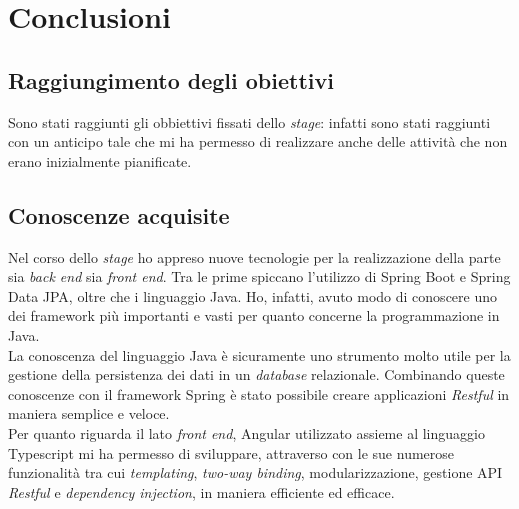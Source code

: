 
\chapter{Conclusioni}
\label{cap:conclusioni}
\section{Raggiungimento degli obiettivi}
Sono stati raggiunti gli obbiettivi fissati dello \textit{stage}: infatti sono
stati raggiunti con un anticipo tale che mi ha permesso di realizzare anche
delle attività che non erano inizialmente pianificate.



\section{Conoscenze acquisite}
Nel corso dello \textit{stage} ho appreso nuove tecnologie per la realizzazione
della parte sia \textit{back end} sia \textit{front end}. Tra le prime spiccano
l'utilizzo di Spring Boot e Spring Data JPA, oltre che i linguaggio Java. Ho,
infatti, avuto modo di conoscere uno  dei \gls{framework}  più importanti e
vasti per quanto concerne la programmazione in Java.\\
La conoscenza del linguaggio Java è sicuramente uno strumento molto utile per
la gestione della persistenza dei dati in un \textit{database} relazionale.
Combinando queste conoscenze con il \gls{framework} Spring è stato possibile
creare applicazioni \textit{Restful} in maniera semplice e veloce.\\
Per quanto riguarda il lato \textit{front end}, Angular utilizzato assieme al
linguaggio Typescript mi ha permesso di sviluppare, attraverso con le sue
numerose funzionalità tra cui \textit{templating}, \textit{two-way binding},
modularizzazione, gestione \gls{API} \textit{Restful} e \textit{dependency
    injection}, in maniera efficiente ed efficace.

